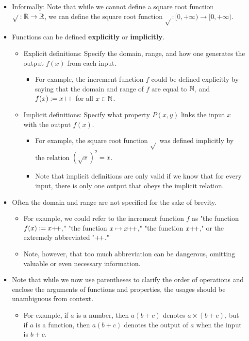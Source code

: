 \documentclass[../main.tex]{subfiles}
\begin{document}
\begin{itemize}
    \item Informally: Note that while we cannot define a square root function $\sqrt{}:\mathbb{R}\to\mathbb{R}$, we can define the square root function $\sqrt{}:[0,+\infty)\to[0,+\infty)$.
    \item Functions can be defined \textbf{explicitly} or \textbf{implicitly}.
    \begin{itemize}
        \item Explicit definitions: Specify the domain, range, and how one generates the output $f(x)$ from each input.
        \begin{itemize}
            \item For example, the increment function $f$ could be defined explicitly by saying that the domain and range of $f$ are equal to $\mathbb{N}$, and $f(x):=x{+\!+}$ for all $x\in\mathbb{N}$.
        \end{itemize}
        \item Implicit definitions: Specify what property $P(x,y)$ links the input $x$ with the output $f(x)$.
        \begin{itemize}
            \item For example, the square root function $\sqrt{}$ was defined implicitly by the relation $(\sqrt{x})^2=x$.
            \item Note that implicit definitions are only valid if we know that for every input, there is only one output that obeys the implicit relation.
        \end{itemize}
    \end{itemize}
    \item Often the domain and range are not specified for the sake of brevity.
    \begin{itemize}
        \item For example, we could refer to the increment function $f$ as "the function $f(x):=x{+\!+}$," "the function $x\mapsto x{+\!+}$," "the function $x{+\!+}$," or the extremely abbreviated "${+\!+}$."
        \item Note, however, that too much abbreviation can be dangerous, omitting valuable or even necessary information.
    \end{itemize}
    \item Note that while we now use parentheses to clarify the order of operations and enclose the arguments of functions and properties, the usages should be unambiguous from context.
    \begin{itemize}
        \item For example, if $a$ is a number, then $a(b+c)$ denotes $a\times(b+c)$, but if $a$ is a function, then $a(b+c)$ denotes the output of $a$ when the input is $b+c$.

\end{itemize}
\end{itemize}
\end{document}
